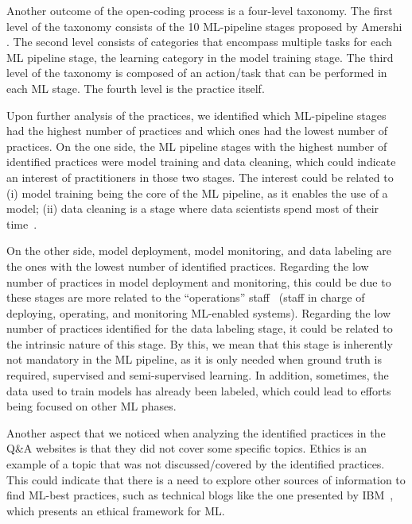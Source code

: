 Another outcome of the open-coding process is a four-level taxonomy. The first level of the taxonomy consists of the 10 ML-pipeline stages proposed by Amershi \etal \cite{amershi2019software}. The second level consists of categories  that encompass multiple tasks for each ML pipeline stage, \eg the learning category in the model training stage. The third level of the taxonomy is composed of an action/task that can be performed in each ML stage. The fourth level is the practice itself.

Upon further analysis of the practices, we identified which ML-pipeline stages had the highest number of practices and which ones had the lowest number of practices.  On the one side, the ML pipeline stages with the highest number of identified practices were model training and data cleaning, which could indicate an interest of practitioners in those two stages. The interest could be related to (i) model training being the core of the ML pipeline, as it enables the use of a model; (ii) data cleaning is a stage where  data scientists spend most of their time~\cite{anacondainc_2022}.   


On the other side, model deployment, model monitoring, and data labeling are the ones with the lowest number of identified practices. Regarding the low number of practices in model deployment and monitoring, this could be due to  these stages are more  related to the “operations” staff~\cite{LewisGrace2021WAIN} (\ie staff in charge of deploying, operating, and monitoring  ML-enabled systems).  Regarding the low number of practices identified for the data labeling stage, it could be related to the intrinsic nature of this stage.  By this, we mean that this stage is inherently  not mandatory in the ML pipeline, as it is only needed when  ground truth is required, \eg supervised and semi-supervised learning. In addition, sometimes, the data used to train models has already been labeled, which could lead to efforts being focused on other ML phases. 

Another  aspect that we noticed when analyzing the identified practices in the Q\&A websites is that they did not cover some specific topics.  Ethics is an example of a topic that was not discussed/covered by the identified practices.  This could indicate that there is a need to explore other sources of information to find ML-best practices, such as  technical blogs like the one presented by IBM~\cite{ibm_ethics}, which presents  an ethical framework for ML. 

